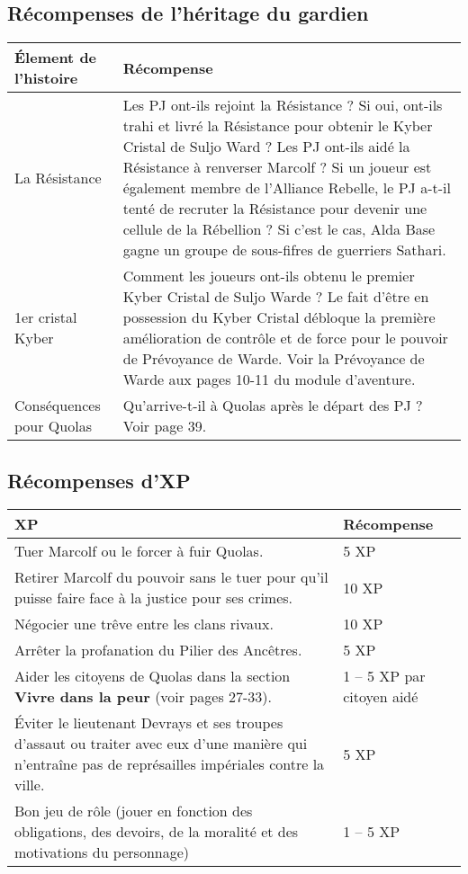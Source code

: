 \documentclass[twoside]{article}
\begin{document}
\subsection{Récompenses de l'héritage du gardien}
\renewcommand{\arraystretch}{1.4}
\begin{tabular}{|p{4.5cm}|p{12cm}|}
	\hline 
	\cellcolor{DarkRed} {\large \textcolor{PureWhite}{\textbf{Élement de l'histoire}}} & \cellcolor{DarkRed} {\large \textcolor{PureWhite}{\textbf{Récompense}}} \\ 
	\hline 
	La Résistance & Les PJ ont-ils rejoint la Résistance ?  Si oui, ont-ils trahi et livré la Résistance pour obtenir le Kyber Cristal de Suljo Ward ?  Les PJ ont-ils aidé la Résistance à renverser Marcolf ?  Si un joueur est également membre de l'Alliance Rebelle, le PJ a-t-il tenté de recruter la Résistance pour devenir une cellule de la Rébellion ?  Si c'est le cas, Alda Base gagne un groupe de sous-fifres de guerriers Sathari. \\ 
	\hline 
	1er cristal Kyber & Comment les joueurs ont-ils obtenu le premier Kyber Cristal de Suljo Warde ?  Le fait d'être en possession du Kyber Cristal débloque la première amélioration de contrôle et de force pour le pouvoir de Prévoyance de Warde.  Voir la Prévoyance de Warde aux pages 10-11 du module d'aventure. \\ 
	\hline 
	Conséquences pour Quolas & Qu'arrive-t-il à Quolas après le départ des PJ ? Voir page 39. \\ 
	\hline 
\end{tabular} 

\subsection{Récompenses d'XP}
\begin{tabular}{|p{12cm}|p{4cm}|}
	\hline 
	\cellcolor{DarkRed} {\large \textcolor{PureWhite}{\textbf{XP}}} & \cellcolor{DarkRed} {\large \textcolor{PureWhite}{\textbf{Récompense}}} \\ 
	\hline 
	Tuer Marcolf ou le forcer à fuir Quolas. & 5 XP \\ 
	\hline 
	Retirer Marcolf du pouvoir sans le tuer pour qu'il puisse faire face à la justice pour ses crimes. & 10 XP \\ 
	\hline 
	Négocier une trêve entre les clans rivaux. & 10 XP \\
	\hline 
	Arrêter la profanation du Pilier des Ancêtres. & 5 XP \\
	\hline 
	Aider les citoyens de Quolas dans la section \textbf{Vivre dans la peur} (voir pages 27-33).	 & 1 -- 5 XP par citoyen aidé \\
	\hline 
	Éviter le lieutenant Devrays et ses troupes d'assaut ou traiter avec eux d'une manière qui n'entraîne pas de représailles impériales contre la ville. & 5 XP \\
	\hline 
	Bon jeu de rôle (jouer en fonction des obligations, des devoirs, de la moralité et des motivations du personnage) & 1 -- 5 XP \\
	\hline 
\end{tabular}
\end{document}
